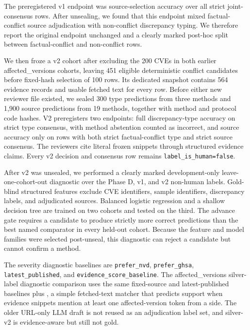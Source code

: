 The preregistered v1 endpoint was source-selection accuracy over all strict joint-consensus rows. After unsealing, we found that this endpoint mixed factual-conflict source adjudication with non-conflict discrepancy typing. We therefore report the original endpoint unchanged and a clearly marked post-hoc split between factual-conflict and non-conflict rows.

We then froze a v2 cohort after excluding the 200 CVEs in both earlier affected\_versions cohorts, leaving 451 eligible deterministic conflict candidates before fixed-hash selection of 100 rows. Its dedicated snapshot contains 564 evidence records and usable fetched text for every row. Before either new reviewer file existed, we sealed 300 type predictions from three methods and 1,900 source predictions from 19 methods, together with method and protocol code hashes. V2 preregisters two endpoints: full discrepancy-type accuracy on strict type consensus, with method abstention counted as incorrect, and source accuracy only on rows with both strict factual-conflict type and strict source consensus. The reviewers cite literal frozen snippets through structured evidence claims. Every v2 decision and consensus row remains \texttt{label\_is\_human=false}.

After v2 was unsealed, we performed a clearly marked development-only leave-one-cohort-out diagnostic over the Phase D, v1, and v2 non-human labels. Gold-blind structured features exclude CVE identifiers, sample identifiers, discrepancy labels, and adjudicated sources. Balanced logistic regression and a shallow decision tree are trained on two cohorts and tested on the third. The advance gate requires a candidate to produce strictly more correct predictions than the best named comparator in every held-out cohort. Because the feature and model families were selected post-unseal, this diagnostic can reject a candidate but cannot confirm a method.

The severity diagnostic baselines are \texttt{prefer\_nvd}, \texttt{prefer\_ghsa}, \texttt{latest\_published}, and \texttt{evidence\_score\_baseline}. The affected\_versions silver-label diagnostic comparison uses the same fixed-source and latest-published baselines plus , a simple fetched-text matcher that predicts support when evidence snippets mention at least one affected-version token from a side. The older URL-only LLM draft is not reused as an adjudication label set, and silver-v2 is evidence-aware but still not gold.

